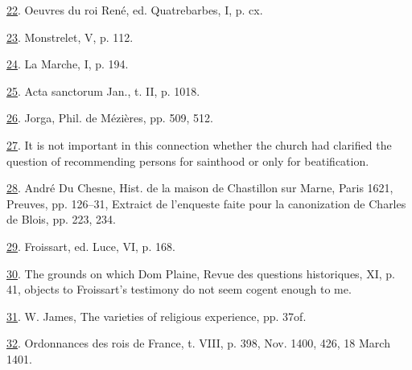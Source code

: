 \protect\hypertarget{23_NOTES.xhtmlux5cux23id_981}{\protect\hyperlink{14_Chapter_Seven__THE_PIOUS_PERSONA.xhtmlux5cux23id_980}{22}}.
Oeuvres du roi René, ed. Quatrebarbes, I, p. cx.

\protect\hypertarget{23_NOTES.xhtmlux5cux23id_979}{\protect\hyperlink{14_Chapter_Seven__THE_PIOUS_PERSONA.xhtmlux5cux23id_978}{23}}.
Monstrelet, V, p. 112.

\protect\hypertarget{23_NOTES.xhtmlux5cux23id_977}{\protect\hyperlink{14_Chapter_Seven__THE_PIOUS_PERSONA.xhtmlux5cux23id_976}{24}}.
La Marche, I, p. 194.

\protect\hypertarget{23_NOTES.xhtmlux5cux23id_975}{\protect\hyperlink{14_Chapter_Seven__THE_PIOUS_PERSONA.xhtmlux5cux23id_974}{25}}.
Acta sanctorum Jan., t. II, p. 1018.

\protect\hypertarget{23_NOTES.xhtmlux5cux23id_973}{\protect\hyperlink{14_Chapter_Seven__THE_PIOUS_PERSONA.xhtmlux5cux23id_972}{26}}.
Jorga, Phil. de Mézières, pp. 509, 512.

\protect\hypertarget{23_NOTES.xhtmlux5cux23id_971}{\protect\hyperlink{14_Chapter_Seven__THE_PIOUS_PERSONA.xhtmlux5cux23id_970}{27}}.
It is not important in this connection whether the church had clarified
the question of recommending persons for sainthood or only for
beatification.

\protect\hypertarget{23_NOTES.xhtmlux5cux23id_969}{\protect\hyperlink{14_Chapter_Seven__THE_PIOUS_PERSONA.xhtmlux5cux23id_968}{28}}.
André Du Chesne, Hist. de la maison de Chastillon sur Marne, Paris 1621,
Preuves, pp. 126--31, Extraict de l'enqueste faite pour la canonization
de Charles de Blois, pp. 223, 234.

\protect\hypertarget{23_NOTES.xhtmlux5cux23id_967}{\protect\hyperlink{14_Chapter_Seven__THE_PIOUS_PERSONA.xhtmlux5cux23id_966}{29}}.
Froissart, ed. Luce, VI, p. 168.

\protect\hypertarget{23_NOTES.xhtmlux5cux23id_965}{\protect\hyperlink{14_Chapter_Seven__THE_PIOUS_PERSONA.xhtmlux5cux23id_964}{30}}.
The grounds on which Dom Plaine, Revue des questions historiques, XI, p.
41, objects to Froissart's testimony do not seem cogent enough to me.

\protect\hypertarget{23_NOTES.xhtmlux5cux23id_963}{\protect\hyperlink{14_Chapter_Seven__THE_PIOUS_PERSONA.xhtmlux5cux23id_962}{31}}.
W. James, The varieties of religious experience, pp. 37of.

\protect\hypertarget{23_NOTES.xhtmlux5cux23id_961}{\protect\hyperlink{14_Chapter_Seven__THE_PIOUS_PERSONA.xhtmlux5cux23id_960}{32}}.
Ordonnances des rois de France, t. VIII, p. 398, Nov. 1400, 426, 18
March 1401.

